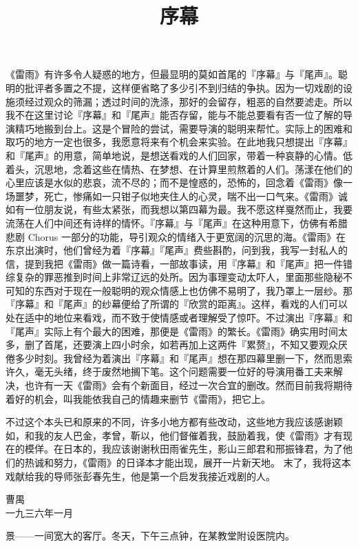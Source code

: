 《雷雨》有许多令人疑惑的地方，但最显明的莫如首尾的『序幕』与『尾声』。聪明的批评者多置之不提，这样便省略了多少引不到归结的争执。因为一切戏剧的设施须经过观众的筛漏；透过时间的洗涤，那好的会留存，粗恶的自然要滤走。所以我不在这里讨论『序幕』和『尾声』能否存留，能与不能总要看有否一位了解的导演精巧地搬到台上。这是个冒险的尝试，需要导演的聪明来帮忙。实际上的困难和取巧的地方一定也很多，我愿意将来有个机会来实验。在此地我只想提出『序幕』和『尾声』的用意，简单地说，是想送看戏的人们回家，带着一种哀静的心情。低着头，沉思地，念着这些在情热、在梦想、在计算里煎熬着的人们。荡漾在他们的心里应该是水似的悲哀，流不尽的；而不是惶惑的，恐怖的，回念着《雷雨》像一场噩梦，死亡，惨痛如一只钳子似地夹住人的心灵，喘不出一口气来。《雷雨》诚如有一位朋友说，有些太紧张，而我想以第四幕为最。我不愿这样戛然而止，我要流荡在人们中间还有诗样的情怀。『序幕』与『尾声』在这种用意下，仿佛有希腊悲剧 Chorus 一部分的功能，导引观众的情绪入于更宽阔的沉思的海。《雷雨》在东京出演时，他们曾经为着『序幕』『尾声』费些斟酌，问到我，我写一封私人的信，提到我把《雷雨》做一篇诗看，一部故事读，用『序幕』和『尾声』把一件错综复杂的罪恶推到时间上非常辽远的处所。因为事理变动太吓人，里面那些隐秘不可知的东西对于现在一般聪明的观众情感上也仿佛不易明了，我乃罩上一层纱。那『序幕』和『尾声』的纱幕便给了所谓的『欣赏的距离』。这样，看戏的人们可以处在适中的地位来看戏，而不致于使情感或者理解受了惊吓。不过演出『序幕』和『尾声』实际上有个最大的困难，那便是《雷雨》的繁长。《雷雨》确实用时间太多，删了首尾，还要演上四小时余，如若再加上这两件『累赘』，不知又要观众厌倦多少时刻。我曾经为着演出『序幕』和『尾声』想在那四幕里删一下，然而思索许久，毫无头绪，终于废然地搁下笔。这个问题需要一位好的导演用番工夫来解决，也许有一天《雷雨》会有个新面目，经过一次合宜的删改。然而目前我将期待着好的机会，叫我能依我自己的情趣来删节《雷雨》，把它上。

不过这个本头已和原来的不同，许多小地方都有些改动，这些地方我应该感谢颖如，和我的友人巴金，孝曾，靳以，他们督催着我，鼓励着我，使《雷雨》才有现在的模佯。在日本的，我应该谢谢秋田雨雀先生，影山三郎君和邢振锋君，为了他们的热诚和努力，《雷雨》的日译本才能出现，展开一片新天地。
末了，我将这本戏献给我的导师张彭春先生，他是第一个启发我接近戏剧的人。

\startalignment[flushright]
曹禺\\
一九三六年一月
\stopalignment

\title{序幕}

景——一间宽大的客厅。冬天，下午三点钟，在某教堂附设医院内。

